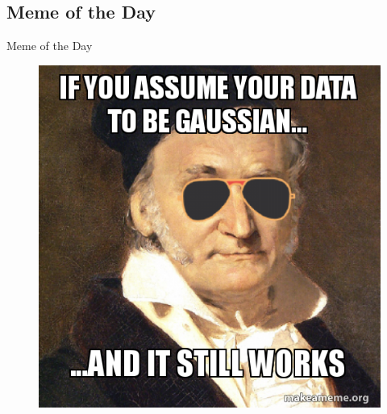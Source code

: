\subsection{Meme of the Day}

\begin{frame}{Meme of the Day}{}
	\begin{figure}
		\includegraphics[scale=0.4]{05_regression/02_img/meme_of_the_day}
	\end{figure}
\end{frame}


\makethanks

